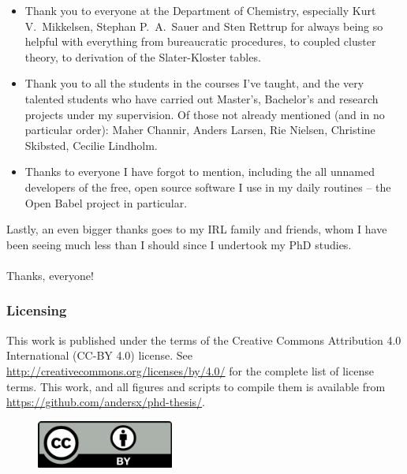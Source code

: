 \begin{itemize}
\item Thank you to everyone at the Department of Chemistry, especially Kurt V.~Mikkelsen, Stephan P.~A.~Sauer and Sten Rettrup for always being so helpful with everything from bureaucratic procedures, to coupled cluster theory, to derivation of the Slater-Kloster tables.

\item Thank you to all the students in the courses I've taught, and the very talented students who have carried out Master's, Bachelor's and research projects under my supervision. Of those not already mentioned (and in no particular order): Maher Channir, Anders Larsen, Rie Nielsen, Christine Skibsted, Cecilie Lindholm.

\item Thanks to everyone I have forgot to mention, including the all unnamed developers of the free, open source software I use in my daily routines -- the Open Babel project in particular.

\end{itemize}
Lastly, an even bigger thanks goes to my IRL family and friends, whom I have been seeing much less than I should since I undertook my PhD studies.
\\\\Thanks, everyone!
\clearpage
\qquad
\vspace{15cm}
\subsubsection*{Licensing}
This work is published under the terms of the Creative Commons Attribution 4.0 International (CC-BY 4.0) license. See \url{http://creativecommons.org/licenses/by/4.0/} for the complete list of license terms.
This work, and all figures and scripts to compile them is available from \url{https://github.com/andersx/phd-thesis/}.
\begin{figure}[h!]
\centering\includegraphics[width=0.4\textwidth]{figures/cc-by.pdf}
\end{figure}
